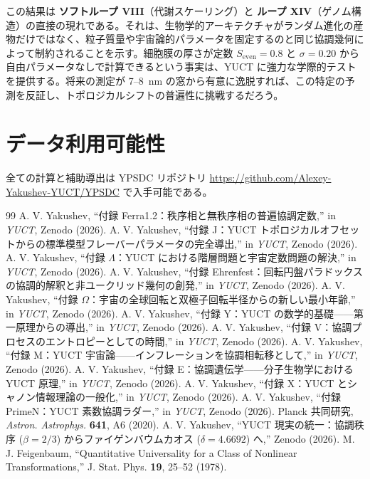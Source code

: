 \documentclass[12pt,a4paper]{article}
\begin{document}
	この結果は \textbf{ソフトループ VIII}（代謝スケーリング）と \textbf{ループ XIV}（ゲノム構造）の直接の現れである。それは、生物学的アーキテクチャがランダム進化の産物だけではなく、粒子質量や宇宙論的パラメータを固定するのと同じ協調幾何によって制約されることを示す。細胞膜の厚さが定数 \(S_{\mathrm{even}} = 0.8\) と \(\sigma = 0.20\) から自由パラメータなしで計算できるという事実は、YUCT に強力な学際的テストを提供する。将来の測定が 7–8~nm の窓から有意に逸脱すれば、この特定の予測を反証し、トポロジカルシフトの普遍性に挑戦するだろう。
	
	\section*{データ利用可能性}
	全ての計算と補助導出は YPSDC リポジトリ \url{https://github.com/Alexey-Yakushev-YUCT/YPSDC} で入手可能である。
	
	\begin{thebibliography}{99}
		 A. V. Yakushev, ``付録 Ferra1.2：秩序相と無秩序相の普遍協調定数,'' in \emph{YUCT}, Zenodo (2026).
		 A. V. Yakushev, ``付録 J：YUCT トポロジカルオフセットからの標準模型フレーバーパラメータの完全導出,'' in \emph{YUCT}, Zenodo (2026).
		 A. V. Yakushev, ``付録 \(\Lambda\)：YUCT における階層問題と宇宙定数問題の解決,'' in \emph{YUCT}, Zenodo (2026).
		 A. V. Yakushev, ``付録 Ehrenfest：回転円盤パラドックスの協調的解釈と非ユークリッド幾何の創発,'' in \emph{YUCT}, Zenodo (2026).
		 A. V. Yakushev, ``付録 \(\Omega\)：宇宙の全球回転と双極子回転半径からの新しい最小年齢,'' in \emph{YUCT}, Zenodo (2026).
		 A. V. Yakushev, ``付録 Y：YUCT の数学的基礎——第一原理からの導出,'' in \emph{YUCT}, Zenodo (2026).
		 A. V. Yakushev, ``付録 V：協調プロセスのエントロピーとしての時間,'' in \emph{YUCT}, Zenodo (2026).
		 A. V. Yakushev, ``付録 M：YUCT 宇宙論——インフレーションを協調相転移として,'' in \emph{YUCT}, Zenodo (2026).
		 A. V. Yakushev, ``付録 E：協調遺伝学——分子生物学における YUCT 原理,'' in \emph{YUCT}, Zenodo (2026).
		 A. V. Yakushev, ``付録 X：YUCT とシャノン情報理論の一般化,'' in \emph{YUCT}, Zenodo (2026).
		 A. V. Yakushev, ``付録 PrimeN：YUCT 素数協調ラダー,'' in \emph{YUCT}, Zenodo (2026).
		 Planck 共同研究, \emph{Astron. Astrophys.} \textbf{641}, A6 (2020).
		 A. V. Yakushev, ``YUCT 現実の統一：協調秩序 (\(\beta = 2/3\)) からファイゲンバウムカオス (\(\delta = 4.6692\)) へ,'' Zenodo (2026).
		 M. J. Feigenbaum, ``Quantitative Universality for a Class of Nonlinear Transformations,'' J. Stat. Phys. \textbf{19}, 25–52 (1978).
	\end{thebibliography}
	
\end{document}
